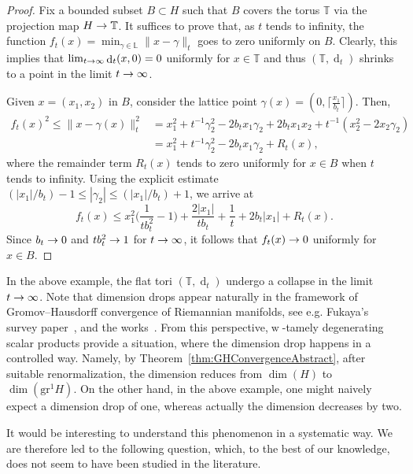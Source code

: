 \documentclass[AHL,Unicode,longabstracts]{cedram}
\newcommand{\norm}[1]{\|#1\|}
\newcommand{\normsq}[1]{\|#1\|^{2}}
\DeclareMathOperator{\weak}{w}
\DeclareMathOperator{\dist}{d}
\newcommand{\T}{\mathbb{T}}
\renewcommand{\L}{\mathbb{L}}
\newcommand{\grm}[2]{\mathrm{gr}_{#1}^{#2}}
\renewcommand*{\to}{\mathchoice{\longrightarrow}{\rightarrow}{\rightarrow}{\rightarrow}}
\begin{document}
\begin{proof}
Fix a bounded subset $B \subset H$ such that $B$ covers the torus $\T$ via the projection map $H \to \T$. It suffices to prove that, as $t$ tends to infinity, the function $f_t(x) = \min_{\gamma \in \L} \norm{x -\gamma}_t$ goes to zero uniformly on $B$. Clearly, this implies that $\lim_{t \to \infty} \dist_t(x,0) = 0$ uniformly for $x \in \T$ and thus $(\T, \dist_t)$ shrinks to a point in the limit $t \to \infty$.

Given $x = (x_1, x_2)$ in $B$, consider the lattice point $\gamma(x) = (0, \lceil \frac {x_1}{b_t} \rceil)$. Then,
\begin{align*}
f_t(x)^2 \le \normsq{x -\gamma(x)}_t &= x_1^2 + t^{-1} \gamma_2^2 - 2 b_t x_1 \gamma_2 + 2b_t x_1 x_2 + t^{-1}\left(x_2^2 - 2 x_2 \gamma_2\right) \\
&= x_1^2 + t^{-1} \gamma_2^2 - 2 b_t x_1 \gamma_2 + R_t(x),
\end{align*}
where the remainder term $R_t(x)$ tends to zero uniformly for $x \in B$ when $t$ tends to infinity. Using the explicit estimate $(|x_1|/b_t) -1 \le |\gamma_2| \le (|x_1|/b_t) + 1$, we arrive at
\[
f_t(x) \le x_1^2 \Big(\frac{1}{t b_t^2} -1\Big) + \frac{2|x_1|}{t b_t} + \frac{1}{t} + 2b_t |x_1| + R_t(x).
\]
Since $b_t \to 0$ and $t b_t^2 \to1$ for $t \to \infty$, it follows that $f_t(x) \to 0$ uniformly for $x \in B$.
\end{proof}




In the above example, the flat tori $(\T, \dist_t)$ undergo a collapse in the limit $t \to\infty$. Note that dimension drops appear naturally in the framework of Gromov--Hausdorff convergence of Riemannian manifolds, see e.g. Fukaya's survey paper~\cite{Fuk90}, and the works~\cite{ CG86, CG90,Fuk87,Gro78, GTZ,Ruh82}. From this perspective,\linebreak $\weak$-tamely degenerating scalar products provide a situation, where the dimension drop happens in a controlled way. Namely, by Theorem~\ref{thm:GHConvergenceAbstract}, after suitable renormalization, the dimension reduces from $\dim(H)$ to $\dim(\grm{}{1}{H})$. On the other hand, in the above example, one might naively expect a dimension drop of one, whereas actually the dimension decreases by two.

It would be interesting to understand this phenomenon in a systematic way. We are therefore led to the following question, which, to the best of our knowledge, does not seem to have been studied in the literature.
\end{document}
